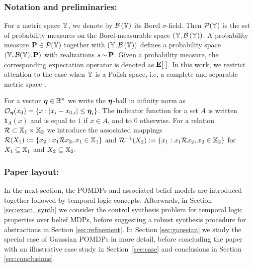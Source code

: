 \documentclass{ifacconf}
\newcommand{\ind}{\mathbf{1}}
\begin{document}
\subsubsection{Notation and preliminaries:}

For a metric space ${\mathbb{Y}}$, we denote by $\mathcal{B}\left({\mathbb{Y}}\right)$ its Borel $\sigma$-field. Then $\mathcal P({\mathbb{Y}})$ is the set of probability measures on the Borel-measurable space $({\mathbb{Y}},\mathcal{B}\left({\mathbb{Y}}\right))$. A probability measure $\mathbf{P} \in \mathcal P({\mathbb{Y}})$ together with $({\mathbb{Y}},\mathcal{B}\left({\mathbb{Y}}\right))$ defines a probability space $({\mathbb{Y}},\mathcal{B}({\mathbb{Y}}),\mathbf{P})$ with realizations $s{\,\sim\,}\mathbf{P}$. Given a probability measure, the corresponding expectation operator is denoted as $\mathbf{E}[\cdot]$. In this work, we restrict attention to the case when ${\mathbb{Y}}$ is a Polish space, i.e, a complete and separable metric space \citep{bogachev2007measure}.

For a vector ${\boldsymbol{\eta}}  \in \mathbb{R}^n$ we write the ${\boldsymbol{\eta}}$-ball in infinity norm as $\mathcal{O}_{\boldsymbol{\eta}}(x_0) = \{ x : |x_i - x_{0,i}| \leq {\boldsymbol{\eta}}_i \}$. The indicator function for a set $A$ is written $\ind_A(x)$ and is equal to $1$ if $x \in A$, and to 0 otherwise. For a relation $\mathcal{R} \subset {\mathbb{X}}_1 \times {\mathbb{X}}_2$ we introduce the associated mappings $\mathcal{R}(X_1):=\{x_2: x_1\mathcal{R} x_2, x_1 \in {\mathbb{X}}_1\}$ and  $\mathcal{R}^{-1}( X_2 ):=\{x_1: x_1\mathcal{R} x_2, x_2 \in {\mathbb{X}}_2 \}$ for $X_1 \subseteq {\mathbb{X}}_1$ and $X_2 \subseteq {\mathbb{X}}_2$.


\subsubsection{Paper layout:}

In the next section, the POMDPs and associated belief models are introduced together followed by temporal logic concepts. Afterwards, in Section \ref{sec:exact_synth} we consider the control synthesis problem for temporal logic properties over belief MDPs, before suggesting a robust synthesis procedure for abstractions in Section \ref{sec:refinement}. In Section \ref{sec:gaussian} we study the special case of Gaussian POMDPs in more detail, before concluding the paper with an illustrative case study in Section~\ref{sec:case} and conclusions in Section \ref{sec:conclusions}.
\end{document}

